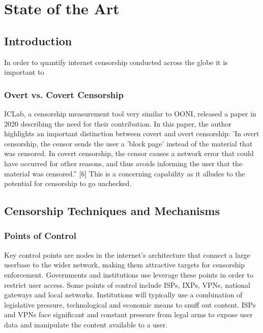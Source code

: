 \chapter{State of the Art}
\section{Introduction}

In order to quantify internet censorship conducted across the globe it is important to 

\subsection{Overt vs. Covert Censorship }
ICLab, a censorship measurement tool very similar to OONI, released a paper in 2020 describing the need for their contribution. In this paper, the author highlights an important distinction between covert and overt censorship: 'In overt censorship, the censor sends the user a 'block page' instead of the material that was censored. In covert censorship, the censor causes a network error that could have occurred for other reasons, and thus avoids informing the user that the material was censored.” [6] This is a concerning capability as it alludes to the potential for censorship to go unchecked. 









\section{Censorship Techniques and Mechanisms} 

\subsection{Points of Control}
Key control points are nodes in the internet’s architecture that connect a large userbase to the wider network, making them attractive targets for censorship enforcement. Governments and institutions use leverage these points in order to restrict user access. Some points of control include ISPs, IXPs, VPNs, national gateways and local networks. Institutions will typically use a combination of legislative pressure, technological and economic means to snuff out content. ISPs and VPNs face significant and constant pressure from legal arms to expose user data and manipulate the content available to a user.

